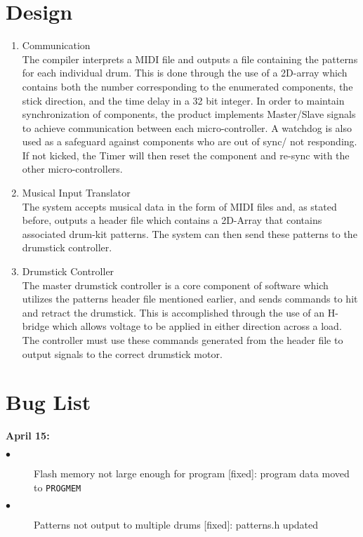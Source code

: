 \documentclass[]{article}
\begin{document}
\section{Design}
\begin{enumerate}
	\item Communication\\The compiler interprets a MIDI file and outputs a file containing the patterns for each individual drum. This is done through the use of a 2D-array which contains both the number corresponding to the enumerated components, the stick direction, and the time delay in a 32 bit integer. In order to maintain synchronization of components, the product implements Master/Slave signals to achieve communication between each micro-controller. A watchdog is also used as a safeguard against components who are out of sync/ not responding. If not kicked, the Timer will then reset the component and re-sync with the other micro-controllers. 
	
	\item Musical Input Translator\\ The system accepts musical data in the form of MIDI files and, as stated before, outputs a header file which contains a 2D-Array that contains associated drum-kit patterns. The system can then send these patterns to the drumstick controller.
	
	\item Drumstick	Controller\\
	The master drumstick controller is a core component of software which utilizes the patterns header file mentioned earlier, and sends commands to hit and retract the drumstick. This is accomplished through the use of an H-bridge which allows voltage to be applied in either direction across a load. The controller must use these commands generated from the header file to output signals to the correct drumstick motor.
\end{enumerate}

\section{Bug List}
\indent \textbf{April 15:}
\begin{description}
\item[$\bullet$] Flash memory not large enough for program [fixed]: program data moved to \texttt{PROGMEM}\\
\item[$\bullet$] Patterns not output to multiple drums [fixed]: patterns.h updated
\end{description}
\end{document}

